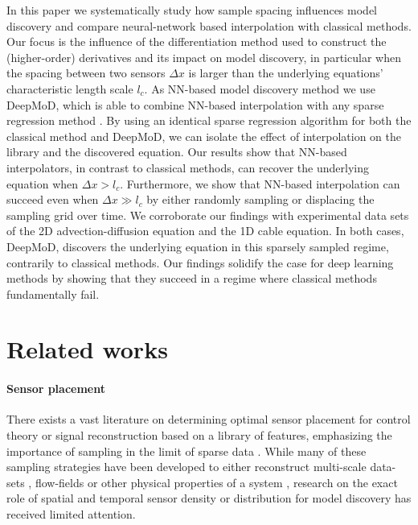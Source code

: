 \documentclass{article} %
\begin{document}
In this paper we systematically study how sample spacing influences model discovery and compare neural-network based interpolation with classical methods. Our focus is the influence of the differentiation method used to construct the (higher-order) derivatives and its impact on model discovery, in particular when the spacing between two sensors $\Delta x$ is larger than the underlying equations' characteristic length scale $l_c$. As NN-based model discovery method we use DeepMoD, which is able to combine NN-based interpolation with any sparse regression method \cite{both2019,both2020}. By using an identical sparse regression algorithm for both the classical method and DeepMoD, we can isolate the effect of interpolation on the library and the discovered equation. Our results show that NN-based interpolators, in contrast to classical methods, can recover the underlying equation when $\Delta x > l_c$. Furthermore, we show that NN-based interpolation can succeed even when $\Delta x \gg l_c$ by either randomly sampling or displacing the sampling grid over time. We corroborate our findings with experimental data sets of the 2D advection-diffusion equation and the 1D cable equation. In both cases, DeepMoD, discovers the underlying equation in this sparsely sampled regime, contrarily to classical methods. Our findings solidify the case for deep learning methods by showing that they succeed in a regime where classical methods fundamentally fail.

\section{Related works}

\paragraph{Sensor placement} 
There exists a vast literature on determining optimal sensor placement for control theory or signal reconstruction based on a library of features, emphasizing the importance of sampling in the limit of sparse data \cite{brunton2013,manohar2018,wang2019}. While many of these sampling strategies have been developed to either reconstruct multi-scale data-sets \cite{champion2019}, flow-fields \cite{brunton2015,loiseau2017sparse} or other physical properties of a system \cite{schaeffer2018extracting}, research on the exact role of spatial and temporal sensor density or distribution for model discovery has received limited attention. 
\end{document}
